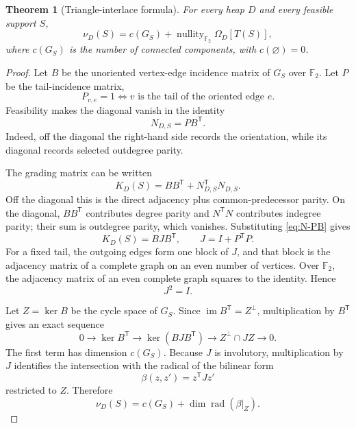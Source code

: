 \documentclass[10pt,letterpaper]{article}
\newtheorem{theorem}{Theorem}
\newcommand{\FF}{\mathbb F_2}
\newcommand{\nullity}{\operatorname{nullity}}
\newcommand{\im}{\operatorname{im}}
\newcommand{\rad}{\operatorname{rad}}
\begin{document}
\begin{theorem}[Triangle-interlace formula]\label{thm:triangle-interlace}
For every heap \(D\) and every feasible support \(S\),
\begin{equation}\label{eq:triangle-formula}
 \boxed{\displaystyle
 \nu_D(S)=c(G_S)+\nullity_{\FF}\Omega_D[T(S)],}
\end{equation}
where \(c(G_S)\) is the number of connected components, with \(c(\varnothing)=0\).
\end{theorem}

\begin{proof}
Let \(B\) be the unoriented vertex-edge incidence matrix of \(G_S\) over \(\FF\).  Let \(P\) be the tail-incidence matrix,
\[
 P_{v,e}=1\Longleftrightarrow v\text{ is the tail of the oriented edge }e.
\]
Feasibility makes the diagonal vanish in the identity
\begin{equation}\label{eq:N-PB}
 N_{D,S}=PB^{\mathsf T}.
\end{equation}
Indeed, off the diagonal the right-hand side records the orientation, while its diagonal records selected outdegree parity.

The grading matrix can be written
\begin{equation}\label{eq:K-B}
 K_D(S)=BB^{\mathsf T}+N_{D,S}^{\mathsf T}N_{D,S}.
\end{equation}
Off the diagonal this is the direct adjacency plus common-predecessor parity.  On the diagonal, \(BB^{\mathsf T}\) contributes degree parity and \(N^{\mathsf T}N\) contributes indegree parity; their sum is outdegree parity, which vanishes.  Substituting \eqref{eq:N-PB} gives
\begin{equation}\label{eq:K-BJB}
 K_D(S)=BJB^{\mathsf T},
 \qquad
 J=I+P^{\mathsf T}P.
\end{equation}
For a fixed tail, the outgoing edges form one block of \(J\), and that block is the adjacency matrix of a complete graph on an even number of vertices.  Over \(\FF\), the adjacency matrix of an even complete graph squares to the identity.  Hence
\begin{equation}\label{eq:J-involution}
 J^2=I.
\end{equation}

Let \(Z=\ker B\) be the cycle space of \(G_S\).  Since \(\im B^{\mathsf T}=Z^\perp\), multiplication by \(B^{\mathsf T}\) gives an exact sequence
\begin{equation}\label{eq:exact-sequence}
 0\longrightarrow\ker B^{\mathsf T}
 \longrightarrow\ker(BJB^{\mathsf T})
 \longrightarrow Z^\perp\cap JZ
 \longrightarrow0.
\end{equation}
The first term has dimension \(c(G_S)\).  Because \(J\) is involutory, multiplication by \(J\) identifies the intersection with the radical of the bilinear form
\begin{equation}\label{eq:beta}
 \beta(z,z')=z^{\mathsf T}Jz'
\end{equation}
restricted to \(Z\).  Therefore
\begin{equation}\label{eq:nu-rad}
 \nu_D(S)=c(G_S)+\dim\rad(\beta|_Z).
\end{equation}


\end{proof}
\end{document}
